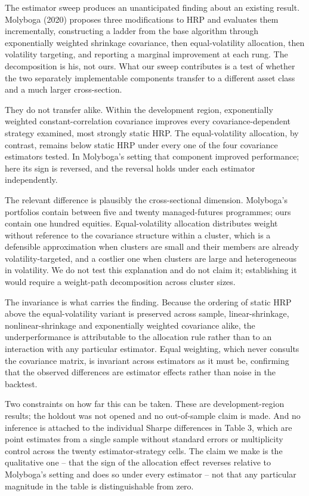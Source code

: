 \documentclass[12pt,letterpaper]{article}
\begin{document}
The estimator sweep produces an unanticipated finding about an existing result.
Molyboga (2020) proposes three modifications to HRP and evaluates them incrementally,
constructing a ladder from the base algorithm through exponentially weighted shrinkage
covariance, then equal-volatility allocation, then volatility targeting, and reporting a
marginal improvement at each rung. The decomposition is his, not ours. What our sweep
contributes is a test of whether the two separately implementable components transfer to
a different asset class and a much larger cross-section.

They do not transfer alike. Within the development region, exponentially weighted
constant-correlation covariance improves every covariance-dependent strategy examined,
most strongly static HRP. The equal-volatility allocation, by contrast, remains below
static HRP under every one of the four covariance estimators tested. In Molyboga's
setting that component improved performance; here its sign is reversed, and the reversal
holds under each estimator independently.

The relevant difference is plausibly the cross-sectional dimension. Molyboga's portfolios
contain between five and twenty managed-futures programmes; ours contain one hundred
equities. Equal-volatility allocation distributes weight without reference to the
covariance structure within a cluster, which is a defensible approximation when clusters
are small and their members are already volatility-targeted, and a costlier one when
clusters are large and heterogeneous in volatility. We do not test this explanation and
do not claim it; establishing it would require a weight-path decomposition across cluster
sizes.

The invariance is what carries the finding. Because the ordering of static HRP above the
equal-volatility variant is preserved across sample, linear-shrinkage,
nonlinear-shrinkage and exponentially weighted covariance alike, the underperformance is
attributable to the allocation rule rather than to an interaction with any particular
estimator. Equal weighting, which never consults the covariance matrix, is invariant
across estimators as it must be, confirming that the observed differences are estimator
effects rather than noise in the backtest.

Two constraints on how far this can be taken. These are development-region results; the
holdout was not opened and no out-of-sample claim is made. And no inference is attached to
the individual Sharpe differences in Table 3, which are point estimates from a single
sample without standard errors or multiplicity control across the twenty
estimator-strategy cells. The claim we make is the qualitative one -- that the sign of the
allocation effect reverses relative to Molyboga's setting and does so under every
estimator -- not that any particular magnitude in the table is distinguishable from
zero.
\end{document}
